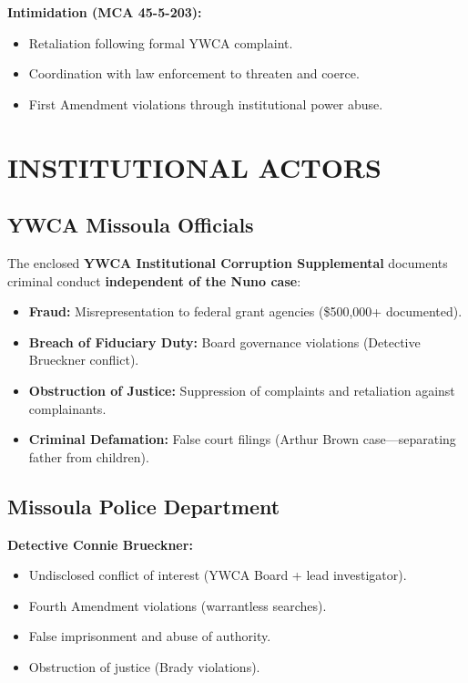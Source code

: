 \documentclass[12pt,oneside]{article}
\begin{document}
\begin{flushleft}
\textbf{Intimidation (MCA 45-5-203):}

\begin{itemize}
\item Retaliation following formal YWCA complaint.
\item Coordination with law enforcement to threaten and coerce.
\item First Amendment violations through institutional power abuse.
\end{itemize}

\section*{INSTITUTIONAL ACTORS}

\subsection*{YWCA Missoula Officials}

The enclosed \textbf{YWCA Institutional Corruption Supplemental} documents criminal conduct \textbf{independent of the Nuno case}:

\begin{itemize}
\item \textbf{Fraud:} Misrepresentation to federal grant agencies (\$500,000+ documented).
\item \textbf{Breach of Fiduciary Duty:} Board governance violations (Detective Brueckner conflict).
\item \textbf{Obstruction of Justice:} Suppression of complaints and retaliation against complainants.
\item \textbf{Criminal Defamation:} False court filings (Arthur Brown case---separating father from children).
\end{itemize}

\subsection*{Missoula Police Department}

\textbf{Detective Connie Brueckner:}

\begin{itemize}
\item Undisclosed conflict of interest (YWCA Board + lead investigator).
\item Fourth Amendment violations (warrantless searches).
\item False imprisonment and abuse of authority.
\item Obstruction of justice (Brady violations).
\end{itemize}


\end{flushleft}
\end{document}
